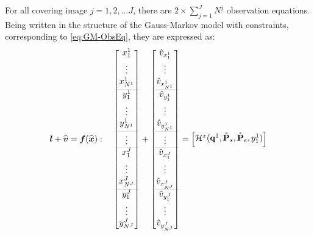 For all covering image $j=1,2,...J$, there are $2\times\displaystyle\sum_{j=1}^{J}N^j$ observation equations. Being written in the structure of the Gauss-Markov model with constraints, corresponding to \cref{eq:GM-ObsEq}, they are expressed as:
\begin{equation} \label{eq:obsvec-allcam}
\boldsymbol l+\widehat{\boldsymbol v}=\boldsymbol f(\widehat{\boldsymbol x}):\quad
\begin{bmatrix}
 x^1_1\\[0.3em]
 \vdots\\
 x^1_{N^1}\\[0.3em]
 \arrayrulecolor{lightgray} \hline
 y^1_1\\[0.3em]
 \vdots\\
 y^1_{N^1}\\[0.3em]
 \arrayrulecolor{lightgray} \hline
 \vdots\\
 \arrayrulecolor{lightgray} \hline
 x^J_1\\[0.3em]
 \vdots\\
 x^J_{N^J}\\[0.3em]
 \arrayrulecolor{lightgray} \hline
 y^J_1\\[0.3em]
 \vdots\\
 y^J_{N^J}\\[0.3em]
\end{bmatrix}
+
\begin{bmatrix}
 \hat{v}_{x^1_1}\\[0.3em]
 \vdots\\
 \hat{v}_{x^1_{N^1}}\\[0.3em]
 \arrayrulecolor{lightgray} \hline
 \hat{v}_{y^1_1}\\[0.3em]
 \vdots\\
 \hat{v}_{y^1_{N^1}}\\[0.3em]
 \arrayrulecolor{lightgray} \hline
 \vdots\\
 \arrayrulecolor{lightgray} \hline
 \hat{v}_{x^J_1}\\[0.3em]
 \vdots\\
 \hat{v}_{x^J_{N^J}}\\[0.3em]
 \arrayrulecolor{lightgray} \hline
 \hat{v}_{y^J_1}\\[0.3em]
 \vdots\\
 \hat{v}_{y^J_{N^J}}\\[0.3em]
\end{bmatrix}
=
\begin{bmatrix}
 \mathcal{H}^x(\mathbf{q}^1,\hat{\mathbf{P}}_s,\hat{\mathbf{P}}_e,y^1_1)\\[0.3em]

\end{bmatrix}
\end{equation}
